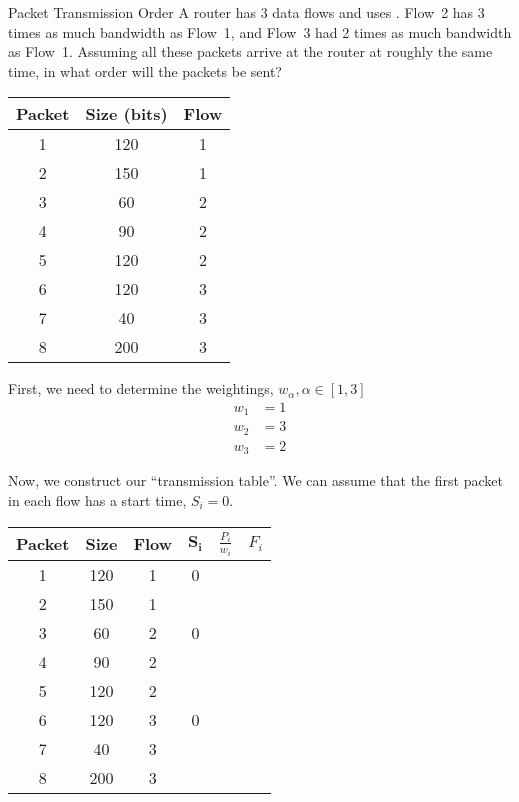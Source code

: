 \begin{example}[Assignment 2]{Packet Transmission Order}
  A router has 3 data flows and uses .
  Flow~2 has 3 times as much bandwidth as Flow~1, and Flow~3 had 2 times as much bandwidth as Flow~1.
  Assuming all these packets arrive at the router at roughly the same time, in what order will the packets be sent?

  \begin{center}
    \begin{tabular}{ccc}
      \toprule
      \textbf{Packet} & \textbf{Size (bits)} & \textbf{Flow} \\
      \midrule
      1 & 120 & 1 \\
      2 & 150 & 1 \\
      3 & 60 & 2 \\
      4 & 90 & 2 \\
      5 & 120 & 2 \\
      6 & 120 & 3 \\
      7 & 40 & 3 \\
      8 & 200 & 3 \\
      \bottomrule
    \end{tabular}
\end{center}

  \tcblower{}
  First, we need to determine the weightings, $w_{\alpha}, \alpha \in [1, 3]$
  \begin{align*}
    w_{1} &= 1 \\
    w_{2} &= 3 \\
    w_{3} &= 2
  \end{align*}

  Now, we construct our ``transmission table''.
  We can assume that the first packet in each flow has a start time, $S_{i} = 0$.
  \begin{center}
    \begin{tabular}{cccccc}
      \toprule
      \textbf{Packet} & \textbf{Size} & \textbf{Flow} & $\mathbf{S_{i}}$ & \textbf{$\frac{P_{i}}{w_{i}}$} & \textbf{$F_{i}$} \\
      \midrule
      1 & 120 & 1 & 0 & & \\
      2 & 150 & 1 & & \\
      3 & 60 & 2 & 0 & & \\
      4 & 90 & 2 & & & \\
      5 & 120 & 2 & & & \\
      6 & 120 & 3 & 0 & \\
      7 & 40 & 3 & & & \\
      8 & 200 & 3 & & & \\
      \bottomrule
    \end{tabular}
\end{center}

\end{example}

